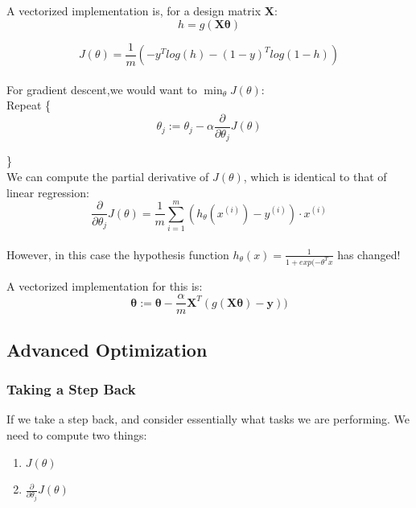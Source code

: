             A vectorized implementation is, for a design matrix $\mathbf{X}$:
            \begin{equation}
                \boxed{
                    h = g(\mathbf{X\theta})
                }
                \label{eq:vectorized-logistic-hypothesis}
            \end{equation} 

            
            \begin{equation}
                \boxed{
                    J (\theta) = \frac{1}{m} (-y^T log(h) - (1-y)^T log(1-h) )
                }
                \label{eq:vectorized-logistic-cost-function}
            \end{equation} \\

            
            For gradient descent,we would want to $\min_{\theta} J(\theta)$:\\ 

             Repeat \{
                \[ 
                \theta_j := \theta_j - \alpha \frac{\partial }{\partial \theta_j} J(\theta)
                \]

            \} \\

   
            We can compute the partial derivative of $J(\theta)$, which is identical to that of linear regression:
            \[
                \frac{\partial }{\partial \theta_j} J(\theta) = \frac{1}{m} \sum_{i=1}^{m} ( h_\theta (x^{(i)}) - y^{(i)} )\cdot x^{(i)} 
            \]\\
            However, in this case the hypothesis function $h_\theta(x) = \frac{1}{1+exp(-\theta^T x}$ has changed!

            A vectorized implementation for this is:
            \begin{equation}
                \boxed{
                    \mathbf{\theta} := \mathbf{\theta} - \frac{\alpha}{m} \mathbf{X}^T( g (\mathbf{X\theta}) - \mathbf{y}))
                }
                \label{eq:vectorized-logistic-gradient-decent}
            \end{equation}



    \subsection{Advanced Optimization}
        \subsubsection{Taking a Step Back}
            If we take a step back, and consider essentially what tasks we are performing. We need to compute two things:
            \begin{enumerate}
                \item $J(\theta)$
                \item $\frac{\partial}{\partial \theta_j}J(\theta)$
            \end{enumerate}

